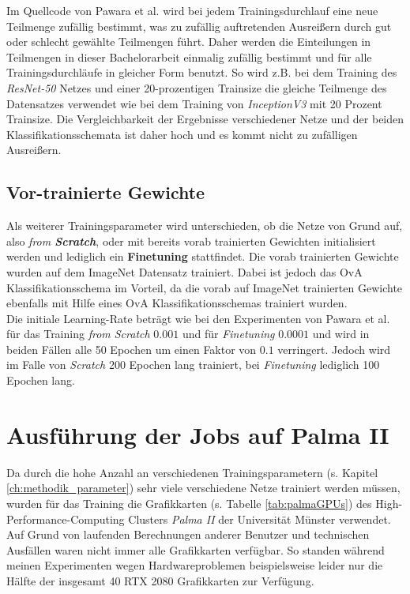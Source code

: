 Im Quellcode von Pawara et al. \cite{pawaraWebsiteCode} wird bei jedem Trainingsdurchlauf eine neue Teilmenge zufällig bestimmt, was zu zufällig auftretenden Ausreißern durch gut oder schlecht gewählte Teilmengen führt.
Daher werden die Einteilungen in Teilmengen in dieser Bachelorarbeit einmalig zufällig bestimmt und für alle Trainingsdurchläufe in gleicher Form benutzt. So wird z.B. bei dem Training des \textit{ResNet-50} Netzes und einer 20-prozentigen Trainsize die gleiche Teilmenge des Datensatzes verwendet wie bei dem Training von \textit{InceptionV3} mit 20 Prozent Trainsize. Die Vergleichbarkeit der Ergebnisse verschiedener Netze und der beiden Klassifikationsschemata ist daher hoch und es kommt nicht zu zufälligen Ausreißern.

\subsection{Vor-trainierte Gewichte}
\label{ch:methodik_gewichte}
Als weiterer Trainingsparameter wird unterschieden, ob die Netze von Grund auf, also \textit{from \textbf{Scratch}}, oder mit bereits vorab trainierten Gewichten initialisiert werden und lediglich ein \textbf{Finetuning} stattfindet. Die vorab trainierten Gewichte wurden auf dem ImageNet Datensatz \cite{imagenet} trainiert.
Dabei ist jedoch das OvA Klassifikationsschema im Vorteil, da die vorab auf ImageNet \cite{imagenet} trainierten Gewichte ebenfalls mit Hilfe eines OvA Klassifikationsschemas trainiert wurden.\\

Die initiale Learning-Rate beträgt wie bei den Experimenten von Pawara et al. \cite{pawaraPaper} für das Training \textit{from Scratch} $0.001$ und für \textit{Finetuning} $0.0001$ und wird in beiden Fällen alle 50 Epochen um einen Faktor von $0.1$ verringert. Jedoch wird im Falle von \textit{Scratch} 200 Epochen lang trainiert, bei \textit{Finetuning} lediglich 100 Epochen lang.



\section{Ausführung der Jobs auf Palma II}
\label{ch:methodik_palma}
Da durch die hohe Anzahl an verschiedenen Trainingsparametern (s. Kapitel \ref{ch:methodik_parameter}) sehr viele verschiedene Netze trainiert werden müssen, wurden für das Training die Grafikkarten (s. Tabelle \ref{tab:palmaGPUs}) des High-Performance-Computing Clusters \textit{Palma II} der Universität Münster \cite{palma2} verwendet.\\
Auf Grund von laufenden Berechnungen anderer Benutzer und technischen Ausfällen waren nicht immer alle Grafikkarten verfügbar. So standen während meinen Experimenten wegen Hardwareproblemen beispielsweise leider nur die Hälfte der insgesamt 40 RTX 2080 Grafikkarten zur Verfügung.

